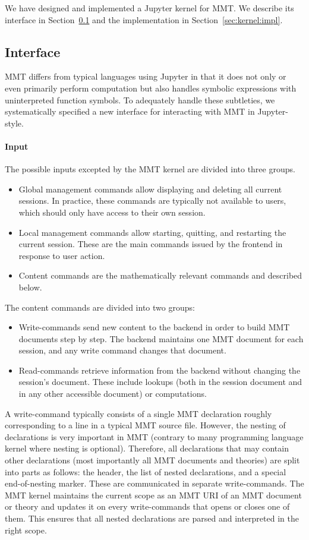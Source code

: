 We have designed and implemented a Jupyter kernel for MMT.
We describe its interface in Section~\ref{sec:kernel:syntax} and the implementation in Section~\ref{sec:kernel:impl}.

\subsection{Interface}\label{sec:kernel:syntax}

MMT differs from typical languages using Jupyter in that it does not only or even primarily perform computation but also handles symbolic expressions with uninterpreted function symbols.
To adequately handle these subtleties, we systematically specified a new interface for interacting with MMT in Jupyter-style.

\paragraph{Input}
The possible inputs excepted by the MMT kernel are divided into three groups.
\begin{itemize}
\item Global management commands allow displaying and deleting all current sessions.
 In practice, these commands are typically not available to users, which should only have access to their own session.
\item Local management commands allow starting, quitting, and restarting the current session. These are the main commands issued by the frontend in response to user action.
\item Content commands are the mathematically relevant commands and described below.
\end{itemize}

The content commands are divided into two groups:
\begin{itemize}
 \item Write-commands send new content to the backend in order to build MMT documents step by step.
   The backend maintains one MMT document for each session, and any write command changes that document.
 \item Read-commands retrieve information from the backend without changing the session's document.
   These include lookups (both in the session document and in any other accessible document) or computations.
\end{itemize}

A write-command typically consists of a single MMT declaration roughly corresponding to a line in a typical MMT source file.
However, the nesting of declarations is very important in MMT (contrary to many programming language kernel where nesting is optional).
Therefore, all declarations that may contain other declarations (most importantly all MMT documents and theories) are split into parts as follows: the header, the list of nested declarations, and a special end-of-nesting marker. These are communicated in separate write-commands.
The MMT kernel maintains the current scope as an MMT URI of an MMT document or theory and updates it on every write-commands that opens or closes one of them.
This ensures that all nested declarations are parsed and interpreted in the right scope.

